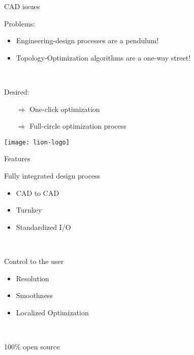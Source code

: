 
\begin{frame}{CAD issues}

	\begin{multicols}{2}
		\begin{block}{Problems:}{
		\begin{itemize}		
			\item Engineering-design processes are a pendulum!
			\item Topology-Optimization algorithms are a one-way street!
		\end{itemize}~\\
		}
		\end{block}
		\columnbreak

		\begin{block}{Desired:}{
		\begin{itemize}		
			\item[$\Rightarrow$] One-click optimization
		\end{itemize}
		\begin{itemize}		
			\item[$\Rightarrow$] Full-circle optimization process	
		\end{itemize}
		}
		\end{block}
				
		\end{multicols}
		
		\texttt{[image: lion-logo]}

\end{frame}	

\begin{frame}{Features}
	
	\begin{block}{Fully integrated design process}{
			\begin{itemize}		
				\item CAD to CAD
				\item Turnkey
				\item Standardized I/O			
			\end{itemize}~\\
		}
	\end{block}
	\begin{block}{Control to the user}{
			\begin{itemize}		
				\item Resolution
				\item Smoothness
				\item Localized Optimization			
			\end{itemize}~\\
		}
	\end{block}	
	\begin{block}{100\% open source}{
		}
	\end{block}
	
\end{frame}

